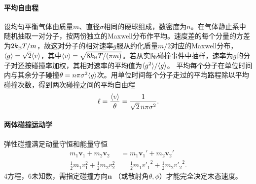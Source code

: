 \paragraph{平均自由程}
设均匀平衡气体由质量$m$、直径$\sigma$相同的硬球组成，数密度为$n$。在气体静止系中随机抽取一对分子，按两份独立的Maxwell分布作平均。速度差的每个分量的方差为$2k_{\mathrm{B}} T/m$，故这对分子的相对速率$g$服从约化质量$m/2$对应的Maxwell分布，$\langle g\rangle = \sqrt 2\langle v\rangle$，其中$\langle v\rangle = \sqrt{8k_{\mathrm{B}} T/(\pi m)}$。若从实际碰撞事件中抽样，速率为$g$的分子对还按碰撞率加权，其相对速率的平均值为$\langle g^2\rangle/\langle g\rangle$。
平均每个分子在单位时间内与其余分子碰撞$\theta = n\pi\sigma^2\langle g\rangle$次。用单位时间每个分子走过的平均路程除以平均碰撞次数，得到两次碰撞之间的平均自由程
\begin{equation}
	\ell = \frac{\langle v\rangle}{\theta} = \frac{1}{\sqrt2\,n\pi\sigma^2}.
\end{equation}
\paragraph{两体碰撞运动学}
弹性碰撞满足动量守恒和能量守恒
\begin{align}
	m_1\bm v_1 + m_2\bm v_2 &= m_1\bm v_1' + m_2\bm v_2'\\
	\frac12m_1v_1^2 + \frac12m_2v_2^2 &= \frac12m_1{v'_1}^2 + \frac12m_2{v'_2}^2.
\end{align}
4方程，6未知数，需指定碰撞方向$\bm n$ （或散射角$\theta,\phi$）才能完全决定末态速度。

